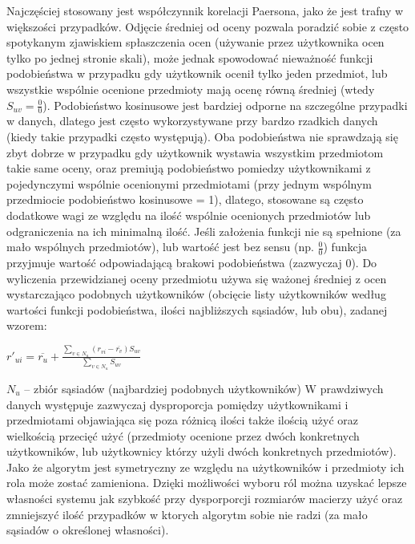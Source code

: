 \documentclass{pracamgr}
\begin{document}
    Najczęściej stosowany jest współczynnik korelacji Paersona, jako że jest trafny w większości przypadków.
    Odjęcie średniej od oceny pozwala poradzić sobie z często spotykanym zjawiskiem spłaszczenia ocen (używanie przez użytkownika ocen tylko po jednej stronie skali),
    może jednak spowodować nieważność funkcji podobieństwa w przypadku gdy użytkownik ocenił tylko jeden przedmiot,
    lub wszystkie wspólnie ocenione przedmioty mają ocenę równą średniej (wtedy $S_{uv}=\frac{0}{0}$).
    Podobieństwo kosinusowe jest bardziej odporne na szczególne przypadki w danych,
    dlatego jest często wykorzystywane przy bardzo rzadkich danych (kiedy takie przypadki często występują).
    Oba podobieństwa nie sprawdzają się zbyt dobrze w przypadku gdy użytkownik wystawia wszystkim przedmiotom takie same oceny,
    oraz premiują podobieństwo pomiedzy użytkownikami z pojedynczymi wspólnie ocenionymi przedmiotami (przy jednym wspólnym przedmiocie podobieństwo kosinusowe = 1),
    dlatego, stosowane są często dodatkowe wagi ze względu na ilość wspólnie ocenionych przedmiotów lub odgraniczenia na ich minimalną ilość.
    Jeśli założenia funkcji nie są spełnione (za mało wspólnych przedmiotów), lub wartość jest bez sensu (np. $\frac{0}{0}$)
    funkcja przyjmuje wartość odpowiadającą brakowi podobieństwa (zazwyczaj 0).\newline\newline
    Do wyliczenia przewidzianej oceny przedmiotu używa się ważonej średniej z ocen wystarczająco podobnych użytkowników
    (obcięcie listy użytkowników według wartości funkcji podobieństwa, ilości najbliższych sąsiadów, lub obu), zadanej wzorem:\newline
    \begin{center}
     $r'_{ui}=\overline{r_{u}}+\frac{\sum\limits_{v\in N_u}(r_{vi}-\overline{r_v})S_{uv}}{\sum\limits_{v\in N_u}S_{uv}}$
    \end{center}
    {\scriptsize
     $N_u$ -- zbiór sąsiadów (najbardziej podobnych użytkowników)
    }\newline\newline
    W prawdziwych danych występuje zazwyczaj dysproporcja pomiędzy użytkownikami i przedmiotami objawiająca się poza różnicą ilości także
    ilością użyć oraz wielkością przecięć użyć (przedmioty ocenione przez dwóch konkretnych użytkowników,
    lub użytkownicy którzy użyli dwóch konkretnych przedmiotów).
    Jako że algorytm jest symetryczny ze względu na użytkowników i przedmioty ich rola może zostać zamieniona.    
    Dzięki możliwości wyboru ról można uzyskać lepsze własności systemu jak szybkość przy dysporporcji rozmiarów macierzy użyć oraz zmniejszyć
    ilość przypadków w ktorych algorytm sobie nie radzi (za mało sąsiadów o określonej własności).
    
\end{document}
